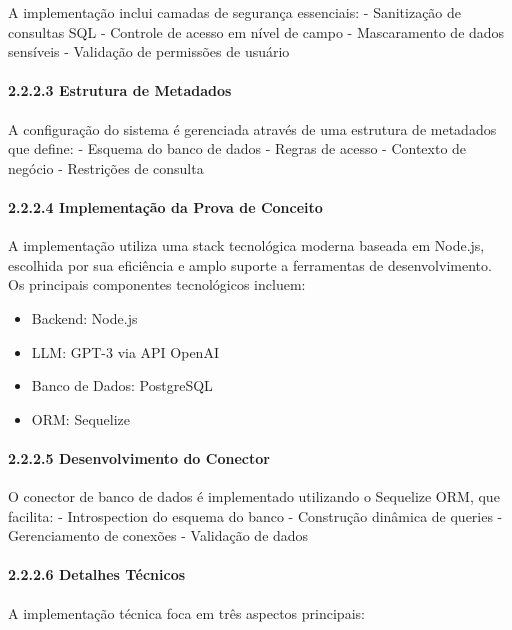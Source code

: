 \documentclass[
]{article}
\providecommand{\tightlist}{%
  \setlength{\itemsep}{0pt}\setlength{\parskip}{0pt}}
\begin{document}
A implementação inclui camadas de segurança essenciais: - Sanitização de
consultas SQL - Controle de acesso em nível de campo - Mascaramento de
dados sensíveis - Validação de permissões de usuário

\paragraph{2.2.2.3 Estrutura de Metadados}\label{estrutura-de-metadados}

A configuração do sistema é gerenciada através de uma estrutura de
metadados que define: - Esquema do banco de dados - Regras de acesso -
Contexto de negócio - Restrições de consulta

\paragraph{2.2.2.4 Implementação da Prova de
Conceito}\label{implementauxe7uxe3o-da-prova-de-conceito}

A implementação utiliza uma stack tecnológica moderna baseada em
Node.js, escolhida por sua eficiência e amplo suporte a ferramentas de
desenvolvimento. Os principais componentes tecnológicos incluem:

\begin{itemize}
\tightlist
\item
  Backend: Node.js
\item
  LLM: GPT-3 via API OpenAI
\item
  Banco de Dados: PostgreSQL
\item
  ORM: Sequelize
\end{itemize}

\paragraph{2.2.2.5 Desenvolvimento do
Conector}\label{desenvolvimento-do-conector}

O conector de banco de dados é implementado utilizando o Sequelize ORM,
que facilita: - Introspection do esquema do banco - Construção dinâmica
de queries - Gerenciamento de conexões - Validação de dados

\paragraph{2.2.2.6 Detalhes Técnicos}\label{detalhes-tuxe9cnicos}

A implementação técnica foca em três aspectos principais:
\end{document}
